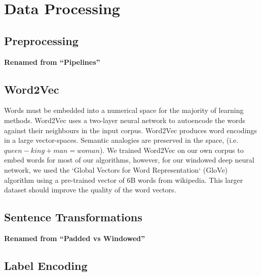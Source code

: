 \section{Data Processing}
\label{sec:data_processing}

  \subsection{Preprocessing}
  \label{sec:preprocessing}
    \textbf{Renamed from ``Pipelines''}

  \subsection{Word2Vec}
  \label{sec:word2vec}
  Words must be embedded into a numerical space for the majority of learning methods. Word2Vec uses a two-layer neural network to autoencode the words against their neighbours in the input corpus. Word2Vec produces word encodings in a large vector-spaces. Semantic analogies are preserved in the space, (i.e. $queen - king + man = woman$). We trained Word2Vec on our own corpus to embed words for most of our algorithms, however, for our windowed deep neural network, we used the `Global Vectors for Word Representation` (GloVe) algorithm using a pre-trained vector of 6B words from wikipedia. This larger dataset should improve the quality of the word vectors.

  \subsection{Sentence Transformations}
  \label{sec:sentence_transformations}
    \textbf{Renamed from ``Padded vs Windowed''}

  \subsection{Label Encoding}
  \label{sec:label_encoding}
